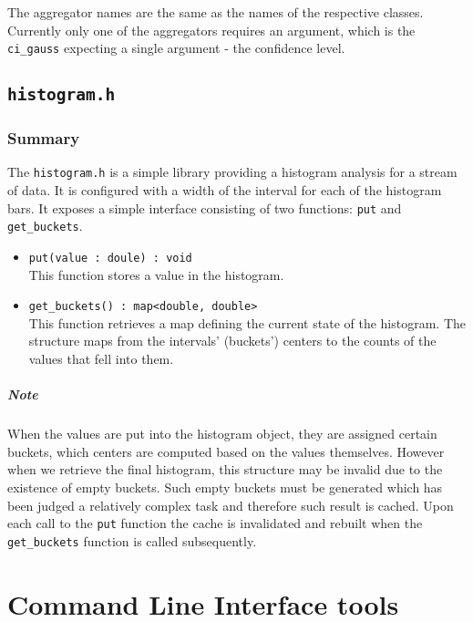 \documentclass{report}
\begin{document}
	The aggregator names are the same as the names of the respective classes. Currently
	only one of the aggregators requires an argument, which is the \texttt{ci\_gauss}
	expecting a single argument - the confidence level.

\section{\texttt{histogram.h}}

	\subsection{Summary}
	The \texttt{histogram.h} is a simple library providing a histogram
	analysis for a stream of data. It is configured with a width of the
	interval for each of the histogram bars. It exposes a simple interface
	consisting of two functions: \texttt{put} and \texttt{get\_buckets}.

	\begin{itemize}
		\item \texttt{put(value : doule) : void}\\
			This function stores a value in the histogram.
		\item \texttt{get\_buckets() : map<double, double>}\\
			This function retrieves a map defining the current state
			of the histogram. The structure maps from the intervals'
			(buckets') centers to the counts of the values that fell
			into them.
	\end{itemize}

	\paragraph{Note}
	When the values are put into the histogram object, they are assigned 
	certain buckets, which centers are computed based on the values themselves.
	However when we retrieve the final histogram, this structure may be invalid
	due to the existence of empty buckets. Such empty buckets must be generated
	which has been judged a relatively complex task and therefore such result is
	cached. Upon each call to the \texttt{put} function the cache is invalidated
	and rebuilt when the \texttt{get\_buckets} function is called subsequently.

\chapter{Command Line Interface tools}
\end{document}
